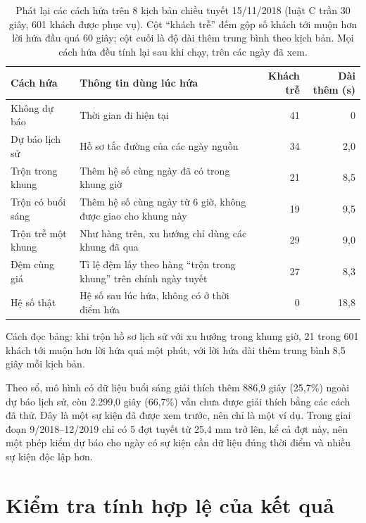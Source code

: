 \begin{table}[htbp]
\centering
\caption{Phát lại các cách hứa trên 8 kịch bản chiều tuyết 15/11/2018 (luật C trần 30 giây, 601 khách được phục
vụ). Cột ``khách trễ'' đếm gộp số khách tới muộn hơn lời hứa đầu quá 60 giây; cột cuối là độ dài thêm trung bình
theo kịch bản. Mọi cách hứa đều tính lại sau khi chạy, trên các ngày đã xem.}
\label{bang:c4-tuyet}
\small
\begin{tabular}{@{}p{3.6cm}p{7.0cm}rr@{}}
\toprule
\textbf{Cách hứa} & \textbf{Thông tin dùng lúc hứa} & \textbf{Khách trễ} & \textbf{Dài thêm (s)}\\
\midrule
Không dự báo & Thời gian đi hiện tại & 41 & 0\\
Dự báo lịch sử & Hồ sơ tắc đường của các ngày nguồn & 34 & 2,0\\
Trộn trong khung & Thêm hệ số cùng ngày đã có trong khung giờ & 21 & 8,5\\
Trộn có buổi sáng & Thêm hệ số cùng ngày từ 6 giờ, không được giao cho khung này & 19 & 9,5\\
Trộn trễ một khung & Như hàng trên, xu hướng chỉ dùng các khung đã qua & 29 & 9,0\\
Đệm cùng giá & Tỉ lệ đệm lấy theo hàng ``trộn trong khung'' trên chính ngày tuyết & 27 & 8,3\\
Hệ số thật & Hệ số sau lúc hứa, không có ở thời điểm hứa & 0 & 18,8\\
\bottomrule
\end{tabular}
\end{table}

Cách đọc bảng: khi trộn hồ sơ lịch sử với xu hướng trong khung giờ, 21 trong 601 khách tới muộn hơn lời hứa quá một
phút, với lời hứa dài thêm trung bình 8,5 giây mỗi kịch bản.

Theo sổ, mô hình có dữ liệu buổi sáng giải thích thêm 886,9 giây (25,7\%) ngoài dự báo lịch sử, còn 2.299,0 giây
(66,7\%) vẫn chưa được giải thích bằng các cách đã thử. Đây là một sự kiện đã được xem trước, nên chỉ là một ví dụ.
Trong giai đoạn 9/2018--12/2019 chỉ có 5 đợt tuyết từ 25,4 mm trở lên, kể cả đợt này, nên một phép kiểm dự báo cho
ngày có sự kiện cần dữ liệu đúng thời điểm và nhiều sự kiện độc lập hơn.

\section{Kiểm tra tính hợp lệ của kết quả}
\label{muc:c4-hople}

